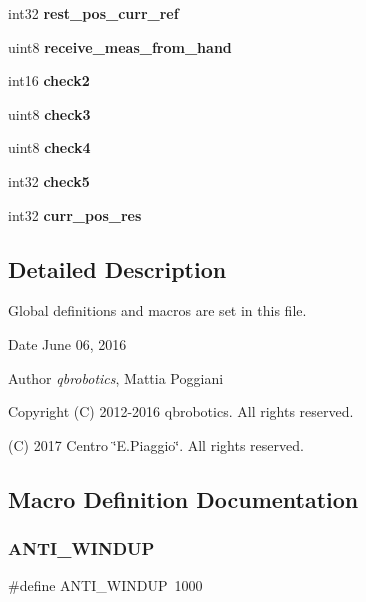 \begin{DoxyCompactItemize}
int32 {\bfseries rest\+\_\+pos\+\_\+curr\+\_\+ref}
\item 
\mbox{\label{globals_8h_a50b50a565306d9a28c9e86694428a759}} 
uint8 {\bfseries receive\+\_\+meas\+\_\+from\+\_\+hand}
\item 
\mbox{\label{globals_8h_ab43d57397f71cb35c19d91058c48bed2}} 
int16 {\bfseries check2}
\item 
\mbox{\label{globals_8h_a07ae6981551bcb1232593903a0cec1be}} 
uint8 {\bfseries check3}
\item 
\mbox{\label{globals_8h_a57815d5e67537f44e37f31deb0cca84e}} 
uint8 {\bfseries check4}
\item 
\mbox{\label{globals_8h_a3e70f7fe645db3f664a6a47e63af6bff}} 
int32 {\bfseries check5}
\item 
\mbox{\label{globals_8h_ab2b7ed40fdef23f9dad3b7351df3b8f4}} 
int32 {\bfseries curr\+\_\+pos\+\_\+res}
\end{DoxyCompactItemize}


\subsection{Detailed Description}
Global definitions and macros are set in this file. 

\begin{DoxyDate}{Date}
June 06, 2016 
\end{DoxyDate}
\begin{DoxyAuthor}{Author}
{\itshape qbrobotics}, Mattia Poggiani 
\end{DoxyAuthor}
\begin{DoxyCopyright}{Copyright}
(C) 2012-\/2016 qbrobotics. All rights reserved. 

(C) 2017 Centro \char`\"{}\+E.\+Piaggio\char`\"{}. All rights reserved. 
\end{DoxyCopyright}


\subsection{Macro Definition Documentation}
\mbox{\label{globals_8h_a66edaed675ab232f06a4e5b3c30d101a}} 
\subsubsection{A\+N\+T\+I\+\_\+\+W\+I\+N\+D\+UP}
{\footnotesize\ttfamily \#define A\+N\+T\+I\+\_\+\+W\+I\+N\+D\+UP~1000}

